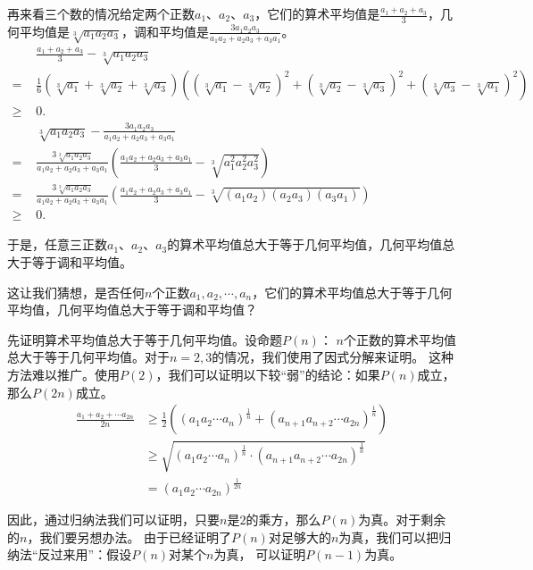\documentclass[12pt,UTF8,fontset=none]{ctexbook}
\begin{document}
再来看三个数的情况给定两个正数$a_1$、$a_2$、$a_3$，它们的算术平均值是$\frac{a_1 + a_2 + a_3}{3}$，几何平均值是$\sqrt[3]{a_1a_2a_3}$，调和平均值是$\frac{3a_1 a_2 a_3}{a_1 a_2 + a_2 a_3 + a_3 a_1}$。
\begin{align*}
    &\frac{a_1 + a_2 + a_3}{3} - \sqrt[3]{a_1a_2a_3}  \\
    =\,\,& \frac{1}{6}(\sqrt[3]{a_1} + \sqrt[3]{a_2} + \sqrt[3]{a_3})\left((\sqrt[3]{a_1} - \sqrt[3]{a_2})^2 + (\sqrt[3]{a_2} - \sqrt[3]{a_3})^2 + (\sqrt[3]{a_3} - \sqrt[3]{a_1})^2\right)  \\
    \geqslant\,\,&0.  \\
    &\sqrt[3]{a_1a_2a_3} - \frac{3a_1 a_2 a_3}{a_1 a_2 + a_2 a_3 + a_3 a_1}  \\
    =\,\,& \frac{3\sqrt[3]{a_1a_2a_3}}{a_1 a_2 + a_2 a_3 + a_3 a_1}\left(\frac{a_1 a_2 + a_2 a_3 + a_3 a_1}{3} - \sqrt[3]{a_1^2a_2^2a_3^2}\right)  \\
    =\,\,& \frac{3\sqrt[3]{a_1a_2a_3}}{a_1 a_2 + a_2 a_3 + a_3 a_1}\left(\frac{a_1 a_2 + a_2 a_3 + a_3 a_1}{3} - \sqrt[3]{(a_1a_2)(a_2a_3)(a_3a_1)}\right)  \\
    \geqslant \,\,&0. 
\end{align*}

于是，任意三正数$a_1$、$a_2$、$a_3$的算术平均值总大于等于几何平均值，几何平均值总大于等于调和平均值。

这让我们猜想，是否任何$n$个正数$a_1, a_2, \cdots , a_n$，它们的算术平均值总大于等于几何平均值，几何平均值总大于等于调和平均值？

先证明算术平均值总大于等于几何平均值。设命题$P(n)$：
$n$个正数的算术平均值总大于等于几何平均值。对于$n=2,3$的情况，我们使用了因式分解来证明。
这种方法难以推广。使用$P(2)$，我们可以证明以下较“弱”的结论：如果$P(n)$成立，那么$P(2n)$成立。
\begin{align*}
    \frac{a_1 + a_2 + \cdots a_{2n}}{2n} &\geqslant \frac{1}{2}\left((a_1a_2\cdots a_{n})^{\frac{1}{n}} + (a_{n+1}a_{n+2}\cdots a_{2n})^{\frac{1}{n}} \right)  \\
    &\geqslant \sqrt{(a_1a_2\cdots a_{n})^{\frac{1}{n}} \cdot (a_{n+1}a_{n+2}\cdots a_{2n})^{\frac{1}{n}}}  \\
    &= (a_1a_2\cdots a_{2n})^{\frac{1}{2n}}
\end{align*}

因此，通过归纳法我们可以证明，只要$n$是$2$的乘方，那么$P(n)$为真。对于剩余的$n$，我们要另想办法。
由于已经证明了$P(n)$对足够大的$n$为真，我们可以把归纳法“反过来用”：假设$P(n)$对某个$n$为真，
可以证明$P(n-1)$为真。
\end{document}
